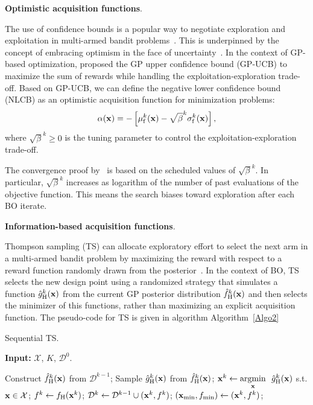 \documentclass[iicol,sn-basic]{sn-jnl}%
\theoremstyle{thmstyleone}%
\theoremstyle{thmstyletwo}
\theoremstyle{thmstylethree}
\begin{document}
\begin{linenumbers}
\noindent
\textbf{Optimistic acquisition functions}.

The use of confidence bounds is a popular way to negotiate exploration and exploitation in multi-armed bandit problems~\citep{Lai1985,Auer2002}.
This is underpinned by the concept of embracing optimism in the face of uncertainty~\citep{Shahriari2016}. 
In the context of GP-based optimization, \cite{Srinivas2010} proposed the GP upper confidence bound (GP-UCB) to maximize the sum of rewards while handling the exploitation-exploration trade-off.
Based on GP-UCB, we can define the negative lower confidence bound (NLCB) as an optimistic acquisition function for minimization problems:
\begin{equation}\label{Eq46}
	\alpha({\bf x}) = -\left[\mu_\text{f}^k({\bf x})-\sqrt{\beta}^k \sigma_\text{f}^k({\bf x})\right],
\end{equation}
where $\sqrt{\beta}^k \geq 0$ is the tuning parameter to control the exploitation-exploration trade-off.

The convergence proof by~\cite{Srinivas2010} is based on the scheduled values of $\sqrt{\beta}^k$.
In particular, $\sqrt{\beta}^k$ increases as logarithm of the number of past evaluations of the objective function.
This means the search biases toward exploration after each BO iterate.

\noindent
\textbf{Information-based acquisition functions}.

Thompson sampling (TS) can allocate exploratory effort to select the next arm in a multi-armed bandit problem by maximizing the reward with respect to a reward function randomly drawn from the posterior~\citep{Agrawal2012,Bijl2016,Russo2018}.
In the context of BO, TS selects the new design point using a randomized strategy that simulates a function $\hat{g}_\text{H}^k({\bf x})$ from the current GP posterior distribution $\hat{f}_\text{H}^k({\bf x})$ and then selects the minimizer of this functions, rather than maximizing an explicit acquisition function. 
The pseudo-code for TS is given in algorithm Algorithm~\ref{Algo2}

\begin{algorithm}
	\caption{Sequential TS.}\label{Algo2}
	\begin{algorithmic}[1]
		\State \textbf{Input:} $\mathcal{X}$, $K$, $\mathcal{D}^0$.
		
		\State Construct $\hat{f}_\text{H}^k({\bf x})$ from $\mathcal{D}^{k-1}$;
		\State Sample $\hat{g}_\text{H}^k({\bf x})$ from $\hat{f}_\text{H}^k({\bf x})$;
		\State ${\bf x}^{k} \gets \underset{{\bf x}}{\mathrm{argmin}} \ \ \hat{g}_\text{H}^k({\bf x})$ s.t. ${\bf x} \in \mathcal{X}$;
		\State $f^{k} \gets f_\text{H}({\bf x}^{k})$;
		\textcolor{black}{}
		\State $\mathcal{D}^k\gets\mathcal{D}^{k-1} \cup ({\bf x}^{k},f^{k})$;
		\State $({\bf x}_{\min},f_{\min}) \gets ({\bf x}^{k},f^{k})$;
		\EndFor
		

\end{algorithmic}
\end{algorithm}
\end{linenumbers}
\end{document}
